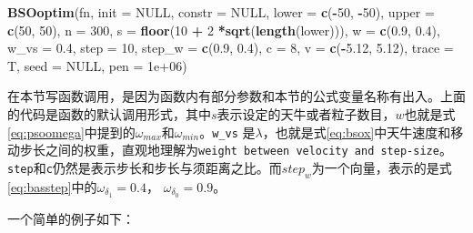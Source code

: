 \documentclass[]{ctexbook}
\newenvironment{Shaded}{\begin{snugshade}}{\end{snugshade}}
\newcommand{\KeywordTok}[1]{\textcolor[rgb]{0.13,0.29,0.53}{\textbf{#1}}}
\newcommand{\DataTypeTok}[1]{\textcolor[rgb]{0.13,0.29,0.53}{#1}}
\newcommand{\DecValTok}[1]{\textcolor[rgb]{0.00,0.00,0.81}{#1}}
\newcommand{\FloatTok}[1]{\textcolor[rgb]{0.00,0.00,0.81}{#1}}
\newcommand{\StringTok}[1]{\textcolor[rgb]{0.31,0.60,0.02}{#1}}
\newcommand{\OtherTok}[1]{\textcolor[rgb]{0.56,0.35,0.01}{#1}}
\newcommand{\OperatorTok}[1]{\textcolor[rgb]{0.81,0.36,0.00}{\textbf{#1}}}
\newcommand{\NormalTok}[1]{#1}
\theoremstyle{definition}
\theoremstyle{definition}
\theoremstyle{definition}
\theoremstyle{remark}
\begin{document}
\begin{Shaded}
\begin{Highlighting}[]
\KeywordTok{BSOoptim}\NormalTok{(fn, }\DataTypeTok{init =} \OtherTok{NULL}\NormalTok{, }\DataTypeTok{constr =} \OtherTok{NULL}\NormalTok{, }
         \DataTypeTok{lower =} \KeywordTok{c}\NormalTok{(}\OperatorTok{-}\DecValTok{50}\NormalTok{, }\OperatorTok{-}\DecValTok{50}\NormalTok{), }\DataTypeTok{upper =} \KeywordTok{c}\NormalTok{(}\DecValTok{50}\NormalTok{, }\DecValTok{50}\NormalTok{), }\DataTypeTok{n =} \DecValTok{300}\NormalTok{, }
         \DataTypeTok{s =} \KeywordTok{floor}\NormalTok{(}\DecValTok{10} \OperatorTok{+}\StringTok{ }\DecValTok{2} \OperatorTok{*}\KeywordTok{sqrt}\NormalTok{(}\KeywordTok{length}\NormalTok{(lower))), }
         \DataTypeTok{w =} \KeywordTok{c}\NormalTok{(}\FloatTok{0.9}\NormalTok{, }\FloatTok{0.4}\NormalTok{), }
         \DataTypeTok{w_vs =} \FloatTok{0.4}\NormalTok{, }
         \DataTypeTok{step =} \DecValTok{10}\NormalTok{,}
         \DataTypeTok{step_w =} \KeywordTok{c}\NormalTok{(}\FloatTok{0.9}\NormalTok{, }\FloatTok{0.4}\NormalTok{), }
         \DataTypeTok{c =} \DecValTok{8}\NormalTok{, }
         \DataTypeTok{v =} \KeywordTok{c}\NormalTok{(}\OperatorTok{-}\FloatTok{5.12}\NormalTok{, }\FloatTok{5.12}\NormalTok{), }
         \DataTypeTok{trace =}\NormalTok{ T,}
         \DataTypeTok{seed =} \OtherTok{NULL}\NormalTok{, }
         \DataTypeTok{pen =} \FloatTok{1e+06}\NormalTok{)}
\end{Highlighting}
\end{Shaded}

在本节写函数调用，是因为函数内有部分参数和本节的公式变量名称有出入。上面的代码是函数的默认调用形式，其中\(s\)表示设定的天牛或者粒子数目，\(w\)也就是式\eqref{eq:psoomega}中提到的\(\omega_{max}\)和\(\omega_{min}\)。\texttt{w\_vs}
是\(\lambda\)，也就是式\eqref{eq:bsox}中天牛速度和移动步长之间的权重，直观地理解为\texttt{weight\ between\ velocity\ and\ step-size}。\texttt{step}和\texttt{c}仍然是表示步长和步长与须距离之比。而\(step_w\)为一个向量，表示的是式\eqref{eq:basstep}中的\(\omega_{\delta_1} = 0.4\)，
\(\omega_{\delta_0} = 0.9\)。

一个简单的例子如下：
\end{document}
